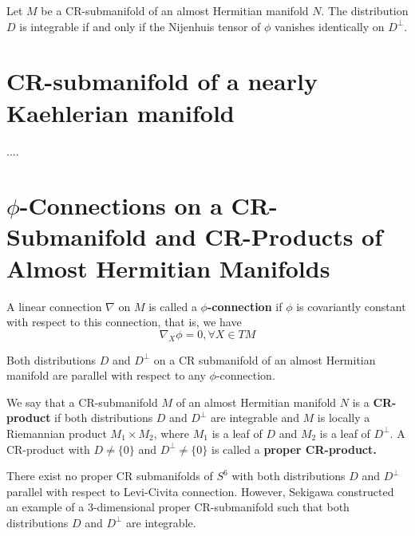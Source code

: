 \begin{theorem}
    Let $M$ be a CR-submanifold of an almost Hermitian manifold $N$. The distribution $D$ is integrable if and only if the Nijenhuis tensor of $\phi$ vanishes identically on $D^{\perp}$.
\end{theorem}

\section{CR-submanifold of a nearly Kaehlerian manifold}
....

\section{\texorpdfstring{$\phi$}{phi}-Connections on a CR-Submanifold and CR-Products of Almost Hermitian Manifolds} 

\begin{definition}
    A linear connection $\nabla$ on $M$ is called a \textbf{$\phi$-connection} if $\phi$ is covariantly constant with respect to this connection, that is, we have
    \begin{equation}
        \nabla_X \phi =0, \forall X\in TM
    \end{equation}
\end{definition}

\begin{theorem}
    Both distributions $D$ and $D^{\perp}$ on a CR submanifold of an almost Hermitian manifold are parallel with respect to any $\phi$-connection.
\end{theorem}

\begin{definition}
    We say that a CR-submanifold \( M \) of an almost Hermitian manifold \( N \) 
is a \textbf{CR-product} if both distributions \( D \) and \( D^{\perp} \) are integrable 
and \( M \) is locally a Riemannian product \( M_1 \times M_2 \), where \( M_1 \) 
is a leaf of \( D \) and \( M_2 \) is a leaf of \( D^{\perp} \). 
A CR-product with \( D \neq \{0\} \) and \( D^{\perp} \neq \{0\} \) is called a 
\textbf{proper CR-product.}
\end{definition}

\begin{example}[An counterexample]
    There exist no proper CR submanifolds of $S^6$ with both distributions $D$ and $D^{\perp}$ parallel with respect to Levi-Civita connection. However, Sekigawa constructed  an example of a 3-dimensional proper CR-submanifold such that both distributions $D$ and $D^{\perp}$ are integrable.
\end{example}

